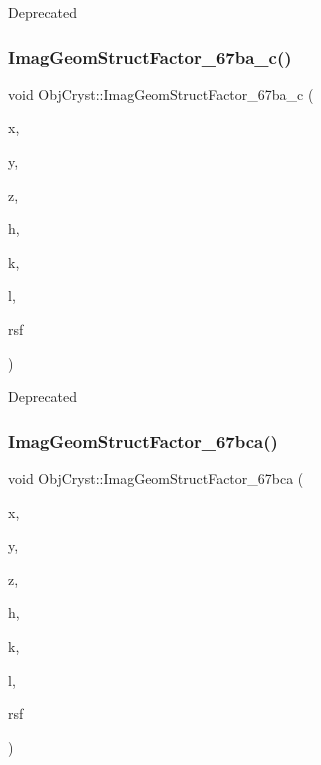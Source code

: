 \begin{DoxyRefDesc}{Deprecated}
\item[\mbox{\hyperlink{deprecated__deprecated000022}{Deprecated}}]\end{DoxyRefDesc}
\mbox{\label{namespace_obj_cryst_af4ed93881a6e70073c45ed8b27e7dd30}} 
\subsubsection{\texorpdfstring{ImagGeomStructFactor\_67ba\_c()}{ImagGeomStructFactor\_67ba\_c()}}
{\footnotesize\ttfamily void Obj\+Cryst\+::\+Imag\+Geom\+Struct\+Factor\+\_\+67ba\+\_\+c (\begin{DoxyParamCaption}\item[{const R\+E\+AL}]{x,  }\item[{const R\+E\+AL}]{y,  }\item[{const R\+E\+AL}]{z,  }\item[{const Cryst\+Vector\+\_\+\+R\+E\+AL \&}]{h,  }\item[{const Cryst\+Vector\+\_\+\+R\+E\+AL \&}]{k,  }\item[{const Cryst\+Vector\+\_\+\+R\+E\+AL \&}]{l,  }\item[{Cryst\+Vector\+\_\+\+R\+E\+AL \&}]{rsf }\end{DoxyParamCaption})}

\begin{DoxyRefDesc}{Deprecated}
\item[\mbox{\hyperlink{deprecated__deprecated000018}{Deprecated}}]\end{DoxyRefDesc}
\mbox{\label{namespace_obj_cryst_ad4298011033a997b83029986f46d30e2}} 
\subsubsection{\texorpdfstring{ImagGeomStructFactor\_67bca()}{ImagGeomStructFactor\_67bca()}}
{\footnotesize\ttfamily void Obj\+Cryst\+::\+Imag\+Geom\+Struct\+Factor\+\_\+67bca (\begin{DoxyParamCaption}\item[{const R\+E\+AL}]{x,  }\item[{const R\+E\+AL}]{y,  }\item[{const R\+E\+AL}]{z,  }\item[{const Cryst\+Vector\+\_\+\+R\+E\+AL \&}]{h,  }\item[{const Cryst\+Vector\+\_\+\+R\+E\+AL \&}]{k,  }\item[{const Cryst\+Vector\+\_\+\+R\+E\+AL \&}]{l,  }\item[{Cryst\+Vector\+\_\+\+R\+E\+AL \&}]{rsf }\end{DoxyParamCaption})}

